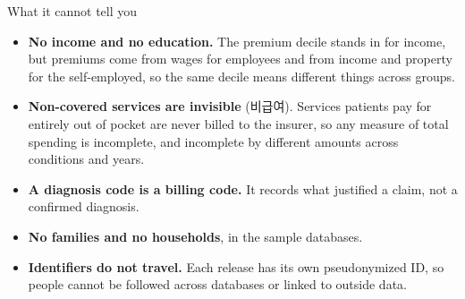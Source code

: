 \documentclass[aspectratio=169,11pt]{beamer}
\newcommand{\hl}[1]{\textbf{\color{kdgreen}#1}}
\newcommand{\han}[1]{{\footnotesize\color{kdgray}(#1)}}
\begin{document}
\begin{frame}{What it cannot tell you}
  \begin{itemize}
    \setlength{\itemsep}{7pt}
    \item \hl{No income and no education.} The premium decile stands in for income,
          but premiums come from wages for employees and from income and property
          for the self-employed, so the same decile means different things across groups.
    \item \hl{Non-covered services are invisible} \han{비급여}. Services patients pay for
          entirely out of pocket are never billed to the insurer, so any measure of
          total spending is incomplete, and incomplete by different amounts across
          conditions and years.
    \item \hl{A diagnosis code is a billing code.} It records what justified a claim,
          not a confirmed diagnosis.
    \item \hl{No families and no households}, in the sample databases.
    \item \hl{Identifiers do not travel.} Each release has its own pseudonymized ID,
          so people cannot be followed across databases or linked to outside data.
  \end{itemize}
\end{frame}
\end{document}
